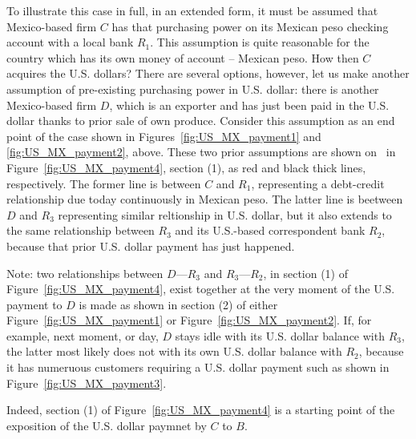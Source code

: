 To illustrate this case in full, in an extended form, it must be assumed that Mexico-based firm $C$ has that purchasing power on its Mexican peso checking account with a local bank $R_1$. This assumption is quite reasonable for the country which has its own money of account -- Mexican peso. How then $C$ acquires the U.S. dollars? There are several options, however, let us make another assumption of pre-existing purchasing power in U.S. dollar: there is another Mexico-based firm $D$, which is an exporter and has just been paid in the U.S. dollar thanks to prior sale of own produce. Consider this assumption as an end point of the case shown in Figures~\ref{fig:US_MX_payment1} and \ref{fig:US_MX_payment2}, above. These two prior assumptions are shown on~\pageref{fig:US_MX_payment4} in Figure~\ref{fig:US_MX_payment4}, section (1), as red and black thick lines, respectively. The former line is between $C$ and $R_1$, representing a debt-credit relationship due today continuously in Mexican peso. The latter line is beetween $D$ and $R_3$ representing similar reltionship in U.S. dollar, but it also extends to the same relationship between $R_3$ and its U.S.-based correspondent bank $R_2$, because that prior U.S. dollar payment has just happened. 

Note: two relationships between $D$---$R_3$ and $R_3$---$R_2$, in section (1) of Figure~\ref{fig:US_MX_payment4}, exist together at the very moment of the U.S. payment to $D$ is made as shown in section (2) of either Figure~\ref{fig:US_MX_payment1} or Figure~\ref{fig:US_MX_payment2}. If, for example, next moment, or day, $D$ stays idle with its U.S. dollar balance with $R_3$, the latter most likely does not with its own U.S. dollar balance with $R_2$, because it has numeruous customers requiring a U.S. dollar payment such as shown in Figure~\ref{fig:US_MX_payment3}.

Indeed, section (1) of Figure~\ref{fig:US_MX_payment4} is a starting point of the exposition of the U.S. dollar paymnet by $C$ to $B$. 


